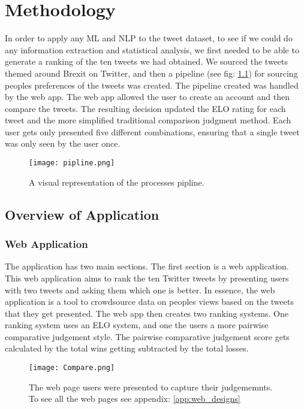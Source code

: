 
\chapter{Methodology}
	\label{chap:typesetting}
	In order to apply any ML and NLP to the tweet dataset, to see if we could do any information extraction and statistical analysis, we first needed to be able to generate a ranking of the ten tweets we had obtained. We sourced the tweets themed around Brexit on Twitter, and then a pipeline (see fig: \ref{fig:pipeline}) for sourcing peoples preferences of the tweets was created. The pipeline created was handled by the web app. The web app allowed the user to create an account and then compare the tweets. The resulting decision updated the ELO rating for each tweet and the more simplified traditional comparison judgment method. Each user gets only presented five different combinations, ensuring that a single tweet was only seen by the user once.
	
	\begin{figure}[h]
		\texttt{[image: pipline.png]}
		\caption{A visual representation of the processes pipline.}
		\label{fig:pipeline}
		
	\end{figure}

	\section{Overview of Application}
	
	\subsection{Web Application}
	The application has two main sections. The first section is a web application. This web application aims to rank the ten Twitter tweets by presenting users with two tweets and asking them which one is better. In essence, the web application is a tool to crowdsource data on peoples views based on the tweets that they get presented. The web app then creates two ranking systems. One ranking system uses an ELO system, and one the users a more pairwise comparative judgement style. The pairwise comparative judgement score gets calculated by the total wins getting subtracted by the total losses.
	
	\begin{figure}[h]
		\centering
		\texttt{[image: Compare.png]}
		\caption{The web page users were presented to capture their judgememnts. To see all the web pages see appendix: \ref{app:web_designs}}
		\label{fig:web_app_example}
		
	\end{figure} 
	
